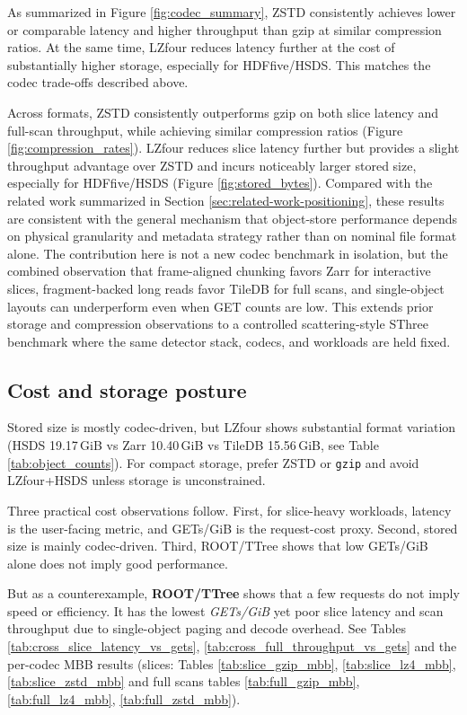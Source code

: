 \documentclass[nomenclature, english, bibtex]{kththesis}
\numberwithin{listing}{chapter}
\begin{document}
As summarized in Figure \ref{fig:codec_summary}, \gls{ZSTD} consistently achieves lower or comparable latency and higher throughput than gzip at similar compression ratios. At the same time, \gls{LZfour} reduces latency further at the cost of substantially higher storage, especially for \gls{HDFfive}/\gls{HSDS}. This matches the codec trade-offs described above.

Across formats, \gls{ZSTD} consistently outperforms gzip on both slice latency and full-scan throughput, while achieving similar compression ratios (Figure \ref{fig:compression_rates}). \gls{LZfour} reduces slice latency further but provides a slight throughput advantage over \gls{ZSTD} and incurs noticeably larger stored size, especially for \gls{HDFfive}/\gls{HSDS} (Figure \ref{fig:stored_bytes}). Compared with the related work summarized in Section \ref{sec:related-work-positioning}, these results are consistent with the general mechanism that object-store performance depends on physical granularity and metadata strategy rather than on nominal file format alone. The contribution here is not a new codec benchmark in isolation, but the combined observation that frame-aligned chunking favors Zarr for interactive slices, fragment-backed long reads favor TileDB for full scans, and single-object layouts can underperform even when GET counts are low. This extends prior storage and compression observations to a controlled scattering-style \gls{SThree} benchmark where the same detector stack, codecs, and workloads are held fixed.

\subsection{Cost and storage posture}
Stored size is mostly codec-driven, but \gls{LZfour} shows substantial format variation (\gls{HSDS} 19.17\,GiB vs Zarr 10.40\,GiB vs TileDB 15.56\,GiB, see Table \ref{tab:object_counts}). For compact storage, prefer \gls{ZSTD} or \texttt{gzip} and avoid \gls{LZfour}+\gls{HSDS} unless storage is unconstrained.

Three practical cost observations follow. First, for slice-heavy workloads, latency is the user-facing metric, and GETs/GiB is the request-cost proxy. Second, stored size is mainly codec-driven. Third, \gls{ROOT}/\gls{TTree} shows that low GETs/GiB alone does not imply good performance.

But as a counterexample, \textbf{\gls{ROOT}/\gls{TTree}} shows that a few requests do not imply speed or efficiency. It has the lowest \emph{GETs/GiB} yet poor slice latency and scan throughput due to single-object paging and decode overhead. See Tables \ref{tab:cross_slice_latency_vs_gets}, \ref{tab:cross_full_throughput_vs_gets} and the per-codec \gls{MBB} results (slices: Tables \ref{tab:slice_gzip_mbb}, \ref{tab:slice_lz4_mbb}, \ref{tab:slice_zstd_mbb} and full scans tables \ref{tab:full_gzip_mbb}, \ref{tab:full_lz4_mbb}, \ref{tab:full_zstd_mbb}).
\end{document}
